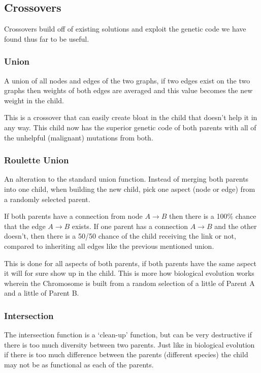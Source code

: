 \documentclass[journal]{IEEEtran}
\begin{document}
  \subsection{Crossovers}
  Crossovers build off of existing solutions and exploit the genetic code we have found thus far to be useful. 
    \subsubsection{Union}
	  A union of all nodes and edges of the two graphs, if two edges exist on the two graphs then 
	  weights of both edges are averaged and this value becomes the new weight in the child.
	  
	  This is a crossover that can easily create bloat in the child that doesn't help it in any way.
	  This child now has the superior genetic code of both parents with all of the unhelpful (malignant) 
	  mutations from both.

    \subsubsection{Roulette Union}
    An alteration to the standard union function. Instead of merging both parents into one child,
    when building the new child, pick one aspect (node or edge) from a randomly selected parent.
    
    If both parents have a connection from node $ A \rightarrow B $ then there is a 100\% chance
    that the edge $A \rightarrow B$ exists. If one parent has a connection $A \rightarrow B$ and
    the other doesn't, then there is a 50/50 chance of the child receiving the link or not,
    compared to inheriting all edges like the previous mentioned union.
    
    This is done for all aspects of both parents, if both parents have the same aspect it will
    for sure show up in the child. This is more how biological evolution works wherein the 
    Chromosome is built from a random selection of a little of Parent A and a little of Parent B.
    
	  
    \subsubsection{Intersection}
    The intersection function is a `clean-up' function, but can be very destructive if there
    is too much diversity between two parents. Just like in biological evolution if there is
    too much difference between the parents (different species) the child may not be as functional
    as each of the parents.
    
\end{document}
